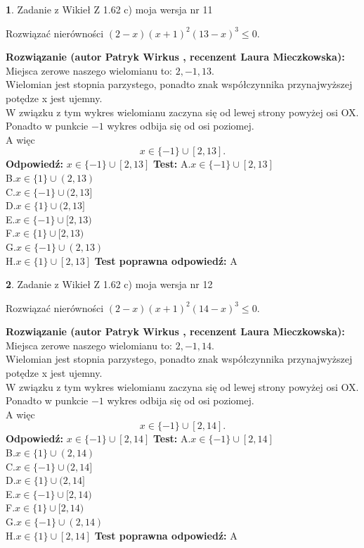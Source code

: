 \documentclass[12pt, a4paper]{article}
\theoremstyle{definition} %
\newtheorem{zad}{}
\newcommand{\zadStart}[1]{\begin{zad}#1\newline}
\newcommand{\zadStop}{\end{zad}}
\newcommand{\rozwStart}[2]{\noindent \textbf{Rozwiązanie (autor #1 , recenzent #2): }\newline}
\newcommand{\rozwStop}{\newline}
\newcommand{\odpStart}{\noindent \textbf{Odpowiedź:}\newline}
\newcommand{\odpStop}{\newline}
\newcommand{\testStart}{\noindent \textbf{Test:}\newline}
\newcommand{\testStop}{\newline}
\newcommand{\kluczStart}{\noindent \textbf{Test poprawna odpowiedź:}\newline}
\newcommand{\kluczStop}{\newline}
\begin{document}
\zadStart{Zadanie z Wikieł Z 1.62 c) moja wersja nr 11}

Rozwiązać nierówności $(2-x)(x+1)^{2}(13-x)^{3}\le0$.
\zadStop
\rozwStart{Patryk Wirkus}{Laura Mieczkowska}
Miejsca zerowe naszego wielomianu to: $2, -1, 13$.\\
Wielomian jest stopnia parzystego, ponadto znak współczynnika przy\linebreak najwyższej potędze x jest ujemny.\\ W związku z tym wykres wielomianu zaczyna się od lewej strony powyżej osi OX.\\
Ponadto w punkcie $-1$ wykres odbija się od osi poziomej.\\
A więc $$x \in \{-1\} \cup [2,13].$$
\rozwStop
\odpStart
$x \in \{-1\} \cup [2,13]$
\odpStop
\testStart
A.$x \in \{-1\} \cup [2,13]$\\
B.$x \in \{1\} \cup (2,13)$\\
C.$x \in \{-1\} \cup (2,13]$\\
D.$x \in \{1\} \cup (2,13]$\\
E.$x \in \{-1\} \cup [2,13)$\\
F.$x \in \{1\} \cup [2,13)$\\
G.$x \in \{-1\} \cup (2,13)$\\
H.$x \in \{1\} \cup [2,13]$
\testStop
\kluczStart
A
\kluczStop



\zadStart{Zadanie z Wikieł Z 1.62 c) moja wersja nr 12}

Rozwiązać nierówności $(2-x)(x+1)^{2}(14-x)^{3}\le0$.
\zadStop
\rozwStart{Patryk Wirkus}{Laura Mieczkowska}
Miejsca zerowe naszego wielomianu to: $2, -1, 14$.\\
Wielomian jest stopnia parzystego, ponadto znak współczynnika przy\linebreak najwyższej potędze x jest ujemny.\\ W związku z tym wykres wielomianu zaczyna się od lewej strony powyżej osi OX.\\
Ponadto w punkcie $-1$ wykres odbija się od osi poziomej.\\
A więc $$x \in \{-1\} \cup [2,14].$$
\rozwStop
\odpStart
$x \in \{-1\} \cup [2,14]$
\odpStop
\testStart
A.$x \in \{-1\} \cup [2,14]$\\
B.$x \in \{1\} \cup (2,14)$\\
C.$x \in \{-1\} \cup (2,14]$\\
D.$x \in \{1\} \cup (2,14]$\\
E.$x \in \{-1\} \cup [2,14)$\\
F.$x \in \{1\} \cup [2,14)$\\
G.$x \in \{-1\} \cup (2,14)$\\
H.$x \in \{1\} \cup [2,14]$
\testStop
\kluczStart
A
\kluczStop
\end{document}
